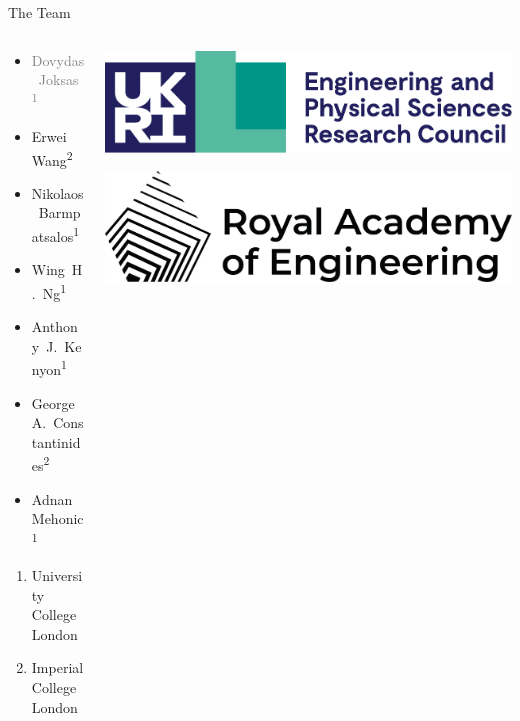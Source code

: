 \documentclass[
  aspectratio=169,
  hyperref={breaklinks=true, colorlinks, citecolor=blue, linkcolor=blue, urlcolor=blue},
]{beamer}
\begin{document}
\begin{frame}{The Team}
  \begin{columns}
    \begin{column}{0.6\textwidth}

      \begin{itemize}
        \item \textcolor{gray}{Dovydas~Joksas\textsuperscript{1}}
        \item Erwei~Wang\textsuperscript{2}
        \item Nikolaos~Barmpatsalos\textsuperscript{1}
        \item Wing~H.~Ng\textsuperscript{1}
        \item Anthony~J.~Kenyon\textsuperscript{1}
        \item George~A.~Constantinides\textsuperscript{2}
        \item Adnan~Mehonic\textsuperscript{1}
      \end{itemize}

      \bigskip

      {\footnotesize
        \begin{enumerate}
          \item University College London
          \item Imperial College London
        \end{enumerate}
      }
    \end{column}

    \begin{column}{0.4\textwidth}
      \includegraphics[width=\linewidth]{figures/PDF/logo-epsrc.pdf}

      \bigskip

      \includegraphics[width=\linewidth]{figures/PDF/logo-raeng.pdf}
    \end{column}

  \end{columns}
\end{frame}
\end{document}
